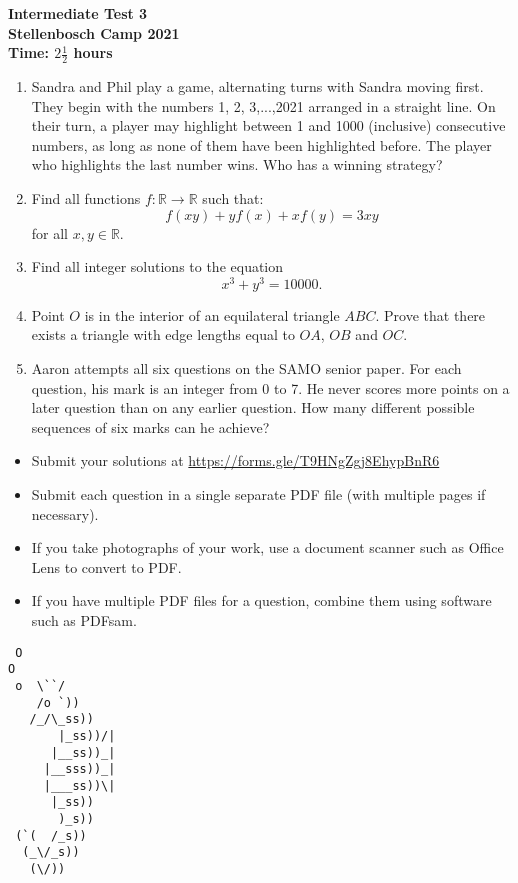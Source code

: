 \documentclass{article}
\begin{document}
\thispagestyle{empty}

\begin{center}
  \textbf{\Large Intermediate Test 3}
  \\ \vspace{1em}
  \textbf{\large Stellenbosch Camp 2021}
  \\ \vspace{1em}
  \textbf{\large Time: $2\frac{1}{2}$ hours}
\end{center}

\bigskip

\begin{enumerate}[itemsep=\fill]

\item %
Sandra and Phil play a game, alternating turns with Sandra moving first. They begin with the numbers 1, 2, 3,...,2021 arranged in a straight line. On their turn, a player may highlight between 1 and 1000 (inclusive) consecutive numbers, as long as none of them have been highlighted before. The player who highlights the last number wins. Who has a winning strategy?


\item %
Find all functions $f: \mathbb{R} \rightarrow \mathbb{R}$ such that:
$$f(xy) + yf(x) + xf(y) = 3xy$$
for all $x, y \in \mathbb{R}$.


\item %
Find all integer solutions to the equation $$ x^3+y^3=10 000.$$


\item %
Point $O$ is in the interior of an equilateral triangle $ABC$. Prove that there exists a triangle with edge lengths equal to $OA$, $OB$ and $OC$.


\item %
Aaron attempts all six questions on the SAMO senior paper. For each question, his mark is an integer from 0 to 7. He never scores more points on a later question than on any earlier question. How many different possible sequences of six marks can he achieve? 
\end{enumerate}


\vfill
\begin{itemize}
	\item Submit your solutions at \href{https://forms.gle/T9HNgZgj8EhypBnR6}{https://forms.gle/T9HNgZgj8EhypBnR6}
	\item Submit each question in a single separate PDF file (with multiple pages if necessary).
	\item If you take photographs of your work, use a document scanner such as Office Lens to convert to PDF.
	\item If you have multiple PDF files for a question, combine them using software such as PDFsam.
\end{itemize}

\vfill
\centering
\small
\begin{BVerbatim}
 O
O
 o  \``/
    /o `))
   /_/\_ss))
       |_ss))/|
      |__ss))_|
     |__sss))_|
     |___ss))\|
      |_ss))
       )_s))
 (`(  /_s))
  (_\/_s))
   (\/))
\end{BVerbatim}
\end{document}
